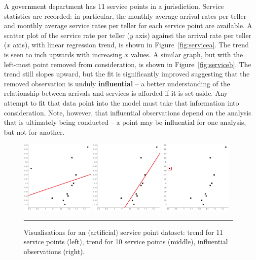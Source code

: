 A government department has 11 service points in a jurisdiction. Service statistics are recorded: in particular, the monthly average arrival rates per teller and monthly average service rates per teller for each service point are available. A scatter plot of the service rate per teller ($y$ axis) against the arrival rate per teller ($x$ axis), with linear regression trend, is shown in Figure~\ref{fig:servicea}. The trend is seen to inch upwards with increasing $x$ values. A similar graph, but with the left-most point removed from consideration, is shown in Figure~\ref{fig:serviceb}. The trend still slopes upward, but the fit is significantly improved suggesting that the removed observation is unduly \textbf{influential} -- a better understanding of the relationship between arrivals and services is afforded if it is set aside. Any attempt to fit that data point into the model must take that information into consideration. Note, however, that influential observations depend on the analysis that is ultimately being conducted -- a point may be influential for one analysis, but not for another.     
\begin{figure}[t]
\centering
\includegraphics[width=0.32\textwidth]{Images/scatter_plot_linear_1}\quad
\includegraphics[width=0.32\textwidth]{Images/scatter_plot_linear_2}\quad
\includegraphics[width=0.32\textwidth]{Images/scatter_plot_2}
\caption[\small Visualisations for a service point dataset]{\small Visualisations for an (artificial) service point dataset: trend for 11 service points (left), trend for 10 service points (middle), influential observations (right).}\hrule
        \label{fig:service_data}
\end{figure}
